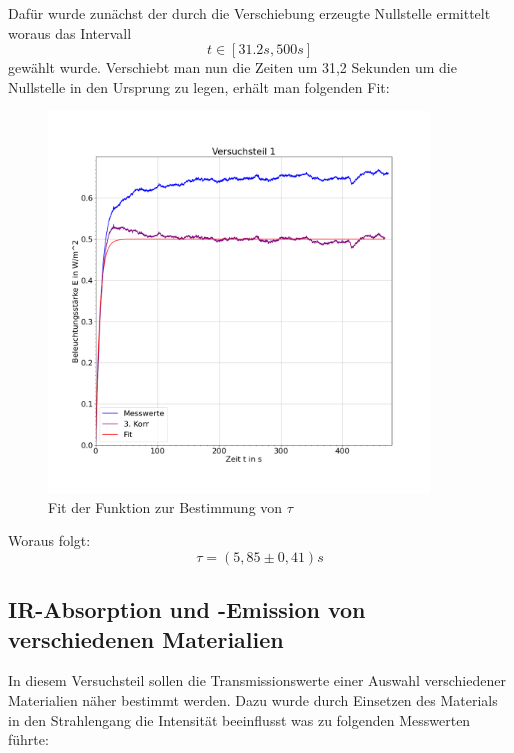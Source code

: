 \documentclass{article}
\begin{document}
            Dafür wurde zunächst der durch die Verschiebung erzeugte Nullstelle ermittelt woraus das Intervall
            $$ t \in [31.2s,500s]$$ 
            gewählt wurde. Verschiebt man nun die Zeiten um 31,2 Sekunden um die Nullstelle in den Ursprung
            zu legen, erhält man folgenden Fit:
            \begin{figure}[H]
                \includegraphics[width=0.9\textwidth]{Daten/DriftKorrekturFit.png}
                \caption{Fit der Funktion zur Bestimmung von $\tau$}
            \end{figure} 
            Woraus folgt:
            $$ \tau =(5,85 \pm 0,41)s$$
        \subsection{IR-Absorption und -Emission von verschiedenen Materialien}
            In diesem Versuchsteil sollen die Transmissionswerte einer Auswahl verschiedener
            Materialien näher bestimmt werden. Dazu wurde durch Einsetzen des Materials 
            in den Strahlengang die Intensität beeinflusst was zu folgenden Messwerten führte:
         
\end{document}
